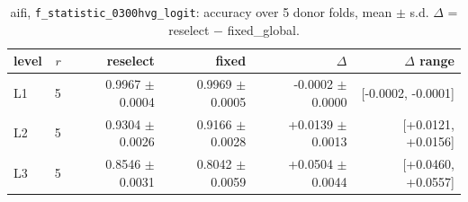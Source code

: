 \begin{table}[t]
\centering
\small
\begin{tabular}{lrrrrr}
\toprule
level & $r$ & reselect & fixed & $\Delta$ & $\Delta$ range \\
\midrule
L1 & 5 & 0.9967 $\pm$ 0.0004 & 0.9969 $\pm$ 0.0005 & -0.0002 $\pm$ 0.0000 & [-0.0002, -0.0001] \\
L2 & 5 & 0.9304 $\pm$ 0.0026 & 0.9166 $\pm$ 0.0028 & +0.0139 $\pm$ 0.0013 & [+0.0121, +0.0156] \\
L3 & 5 & 0.8546 $\pm$ 0.0031 & 0.8042 $\pm$ 0.0059 & +0.0504 $\pm$ 0.0044 & [+0.0460, +0.0557] \\
\bottomrule
\end{tabular}
\caption{aifi, \texttt{f\_statistic\_0300hvg\_logit}: accuracy over 5 donor folds, mean $\pm$ s.d. $\Delta$ = reselect $-$ fixed\_global.}
\label{tab:cv-aifi-f-statistic-0300hvg-logit-accuracy}
\end{table}